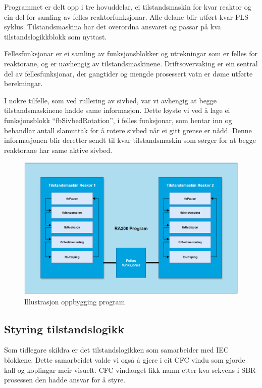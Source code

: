 Programmet er delt opp i tre hovuddelar, ei tilstandsmaskin for kvar reaktor og ein del for samling av felles reaktorfunksjonar.
Alle delane blir utført kvar \gls{PLS} syklus. 
Tilstandsmaskina har det overordna ansvaret og passar på kva tilstandslogikkblokk som nyttast.

Fellesfunksjonar er ei samling av funksjonsblokker og utrekningar som er felles for reaktorane, og er uavhengig av tilstandsmaskinene.
Driftsovervaking er ein sentral del av fellesfunksjonar, der gangtider og mengde prosessert vatn er døme utførte berekningar.

I nokre tilfelle, som ved rullering av sivbed, var vi avhengig at begge tilstandsmaskinene hadde same informasjon.
Dette løyste vi ved å lage ei funksjonsblokk ``fbSivbedRotation'', i felles funksjonar, som hentar inn og behandlar antall slamuttak for å rotere sivbed når ei gitt grense er nådd.
Denne informasjonen blir deretter sendt til kvar tilstandsmaskin som sørger for at begge reaktorane har same aktive sivbed.

\begin{figure}[htbp]
    \centering
    \includegraphics[width=1\textwidth]{Figurar/Oppbygging_Program.png}
    \caption{Illustrasjon oppbygging program}\label{fig:OppbyggingProgram}
\end{figure}

\newpage

\subsection{Styring tilstandslogikk}

Som tidlegare skildra er det tilstandslogikken som samarbeider med \gls{IEC} blokkene. Dette samarbeidet valde vi også å gjere i eit
\gls{CFC} vindu som gjorde kall og koplingar meir visuelt. \gls{CFC} vindauget fikk namn etter kva sekvens i \gls{SBR}-prosessen
den hadde ansvar for å styre. 

